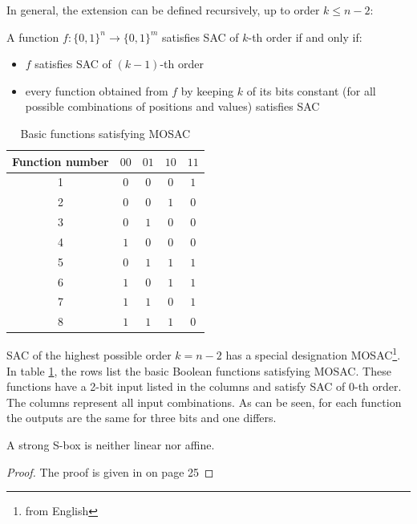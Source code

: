 In general, the extension can be defined recursively, up to order $k \leq n - 2$:

\begin{definition} A function $f: \{0,1\}^n \rightarrow \{0,1\}^m$ satisfies
SAC of $k$-th order if and only if:
  \begin{itemize}
    \item $f$ satisfies SAC of $(k - 1)$-th order
    \item every function obtained from $f$ by keeping $k$ of its bits constant
    (for all possible combinations of positions and values) satisfies SAC
  \end{itemize}
\end{definition}

\begin{table}
\begin{center}
  \begin{tabular}{| c | c | c | c | c |}
  \hline
  Function number & $00$ & $01$ & $10$ &  $11$\\ \hline
             1 &  $0$ &  $0$ &  $0$ &   $1$\\ \hline
             2 &  $0$ &  $0$ &  $1$ &   $0$\\ \hline
             3 &  $0$ &  $1$ &  $0$ &   $0$\\ \hline
             4 &  $1$ &  $0$ &  $0$ &   $0$\\ \hline
             5 &  $0$ &  $1$ &  $1$ &   $1$\\ \hline
             6 &  $1$ &  $0$ &  $1$ &   $1$\\ \hline
             7 &  $1$ &  $1$ &  $0$ &   $1$\\ \hline
             8 &  $1$ &  $1$ &  $1$ &   $0$\\ \hline
  \end{tabular}
  \caption{Basic functions satisfying MOSAC \cite{yokohama}}
  \label{miniSAC}
\end{center}
\end{table}

SAC of the highest possible order $k = n - 2$ has a special designation MOSAC\footnote{from English }.
In table \ref{miniSAC}, the rows list the basic Boolean functions satisfying MOSAC.
These functions have a 2-bit input listed in the columns and satisfy SAC of 0-th order. The columns represent all
input combinations. As can be seen, for each function the outputs are the same for three bits and one
differs.

\begin{theorem}
A strong S-box is neither linear nor affine.
\end{theorem}
\begin{proof}
The proof is given in \cite{yokohama} on page 25
\end{proof}

